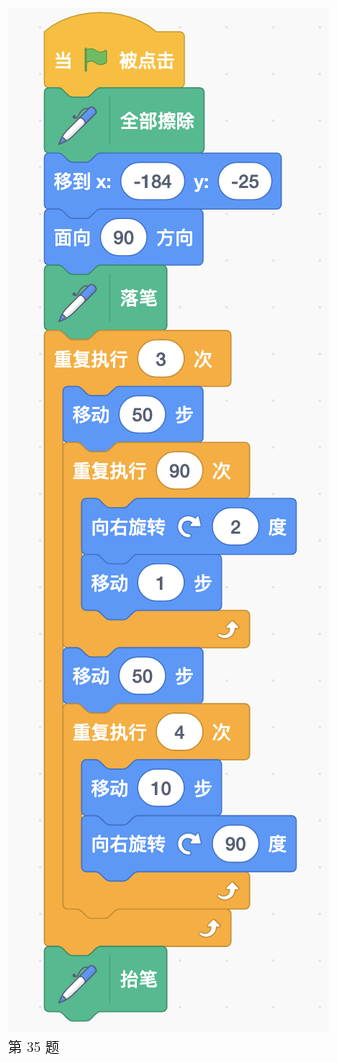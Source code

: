 \documentclass[10pt, a4paper]{article}
\begin{document}
\begin{enumerate}
\begin{figure}[htbp]
\begin{minipage}[t]{.2\textwidth}
                \includegraphics[width=\textwidth]{35-2.png}
                \caption*{第 35 题}
            \end{minipage}
        \end{figure}


\end{enumerate}
\end{document}
